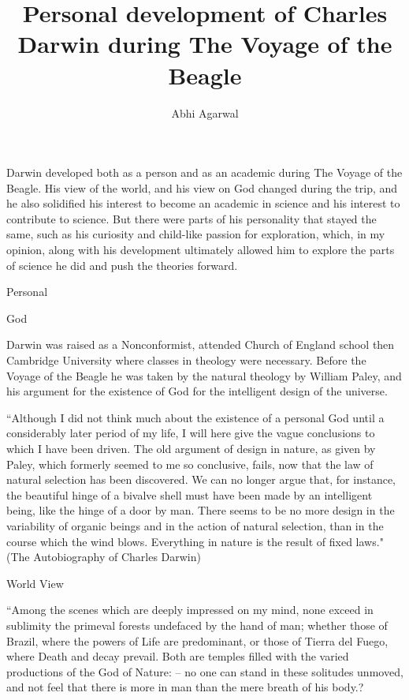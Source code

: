 \documentclass[11pt, oneside]{article}
\title{Personal development of Charles Darwin during The Voyage of the Beagle}
\author{Abhi Agarwal}
\date{}
\begin{document}
\maketitle

\par Darwin developed both as a person and as an academic during The Voyage of the Beagle. His view of the world, and his view on God changed during the trip, and he also solidified his interest to become an academic in science and his interest to contribute to science. But there were parts of his personality that stayed the same, such as his curiosity and child-like passion for exploration, which, in my opinion, along with his development ultimately allowed him to explore the parts of science he did and push the theories forward.

\par Personal

God

Darwin was raised as a Nonconformist, attended Church of England school then Cambridge University where classes in theology were necessary. Before the Voyage of the Beagle he was taken by the natural theology by William Paley, and his argument for the existence of God for the intelligent design of the universe.

``Although I did not think much about the existence of a personal God until a considerably later period of my life, I will here give the vague conclusions to which I have been driven. The old argument of design in nature, as given by Paley, which formerly seemed to me so conclusive, fails, now that the law of natural selection has been discovered. We can no longer argue that, for instance, the beautiful hinge of a bivalve shell must have been made by an intelligent being, like the hinge of a door by man. There seems to be no more design in the variability of organic beings and in the action of natural selection, than in the course which the wind blows. Everything in nature is the result of fixed laws." (The Autobiography of Charles Darwin)

World View

``Among the scenes which are deeply impressed on my mind, none exceed in sublimity the primeval forests undefaced by the hand of man; whether those of Brazil, where the powers of Life are predominant, or those of Tierra del Fuego, where Death and decay prevail. Both are temples filled with the varied productions of the God of Nature: -- no one can stand in these solitudes unmoved, and not feel that there is more in man than the mere breath of his body.? 
\end{document}
